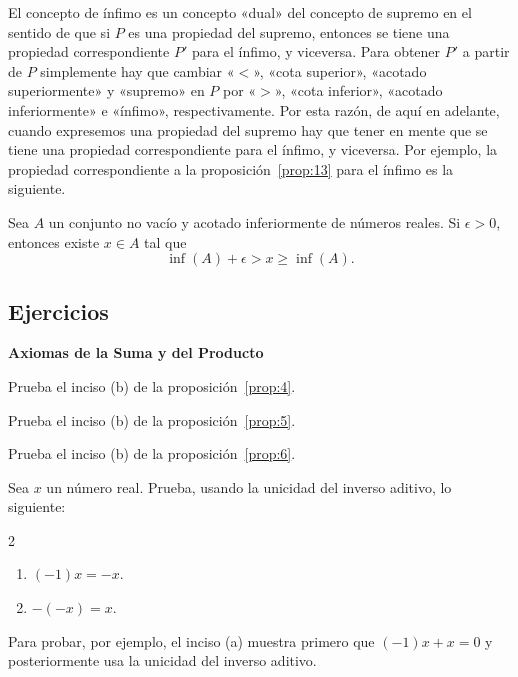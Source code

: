 \documentclass[12pt,a4paper]{book}
\newcommand{\subtitulo}[1]{\par\avoidorphan{5}\addvspace{\medskipamount}\noindent\textbf{#1}\par\nobreak}
\begin{document}
    \begin{observacion}\label{obs:5}
        El concepto de ínfimo es un concepto «dual» del concepto
        de supremo en el sentido de que si $P$ es una propiedad del supremo, entonces
        se tiene una propiedad correspondiente $P'$ para el ínfimo, y viceversa. Para
        obtener $P'$ a partir de $P$ simplemente hay que cambiar «$<$», «cota superior»,
        «acotado superiormente» y «supremo» en $P$ por «$>$», «cota inferior»,
        «acotado inferiormente» e «ínfimo», respectivamente. Por esta razón, de aquí
        en adelante, cuando expresemos una propiedad del supremo hay que tener en
        mente que se tiene una propiedad correspondiente para el ínfimo, y viceversa.
        Por ejemplo, la propiedad correspondiente a la proposición~\ref{prop:13} para el ínfimo
        es la siguiente.
    \end{observacion}

    \begin{proposicion}\label{prop:14}
        Sea $A$ un conjunto no vacío y acotado inferiormente de
        números reales. Si $\epsilon>0$, entonces existe $x\in A$ tal que
        \begin{equation*}
            \inf(A)+\epsilon>x\geq\inf(A).
        \end{equation*}
    \end{proposicion}

    \par{}\subsection*{Ejercicios}

    \subtitulo{Axiomas de la Suma y del Producto}

    \begin{ejercicio}\label{ej:10}
        Prueba el inciso (b) de la proposición~\ref{prop:4}.
    \end{ejercicio}

    \begin{ejercicio}\label{ej:11}
        Prueba el inciso (b) de la proposición~\ref{prop:5}.
    \end{ejercicio}

    \begin{ejercicio}\label{ej:12}
        Prueba el inciso (b) de la proposición~\ref{prop:6}.
    \end{ejercicio}

    \begin{ejercicio}\label{ej:13}
        Sea $x$ un número real. Prueba, usando la unicidad del inverso
        aditivo, lo siguiente:
        \begin{multicols}{2}
        \begin{enumerate}[nosep]
            \item $(-1)x=-x$.
            \item $-(-x)=x$.
        \end{enumerate}
        \end{multicols}
        \sugerencia Para probar, por ejemplo, el inciso (a) muestra primero que
        $(-1)x+x=0$ y posteriormente usa la unicidad del inverso aditivo.
    \end{ejercicio}
\end{document}
